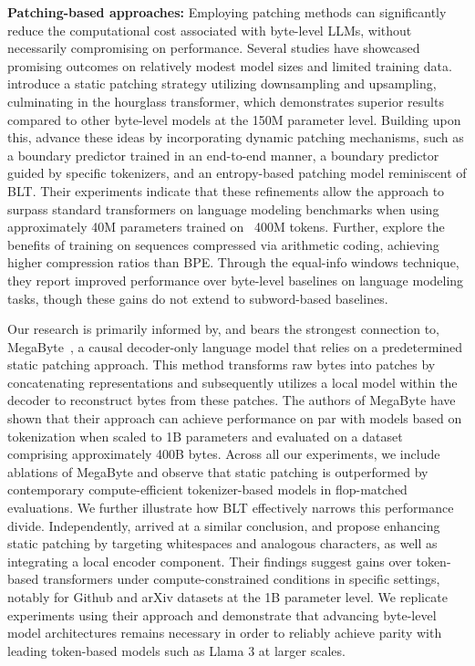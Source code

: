 \textbf{Patching-based approaches:} Employing patching methods can significantly reduce the computational cost associated with byte-level LLMs, without necessarily compromising on performance. Several studies have showcased promising outcomes on relatively modest model sizes and limited training data. \cite{nawrot-etal-2022-hierarchical} introduce a static patching strategy utilizing downsampling and upsampling, culminating in the hourglass transformer, which demonstrates superior results compared to other byte-level models at the 150M parameter level. Building upon this, \cite{nawrot-etal-2023-efficient} advance these ideas by incorporating dynamic patching mechanisms, such as a boundary predictor trained in an end-to-end manner, a boundary predictor guided by specific tokenizers, and an entropy-based patching model reminiscent of {\textsc BLT}. Their experiments indicate that these refinements allow the approach to surpass standard transformers on language modeling benchmarks when using approximately 40M parameters trained on ~400M tokens. Further, \cite{lester2024training} explore the benefits of training on sequences compressed via arithmetic coding, achieving higher compression ratios than BPE. Through the equal-info windows technique, they report improved performance over byte-level baselines on language modeling tasks, though these gains do not extend to subword-based baselines.

Our research is primarily informed by, and bears the strongest connection to, MegaByte~\citep{yu2023megabyte}, a causal decoder-only language model that relies on a predetermined static patching approach. This method transforms raw bytes into patches by concatenating representations and subsequently utilizes a local model within the decoder to reconstruct bytes from these patches. The authors of MegaByte have shown that their approach can achieve performance on par with models based on tokenization when scaled to 1B parameters and evaluated on a dataset comprising approximately 400B bytes. Across all our experiments, we include ablations of MegaByte and observe that static patching is outperformed by contemporary compute-efficient tokenizer-based models in flop-matched evaluations. We further illustrate how {\textsc BLT} effectively narrows this performance divide. Independently, \cite{slagle2024spacebyte} arrived at a similar conclusion, and propose enhancing static patching by targeting whitespaces and analogous characters, as well as integrating a local encoder component. Their findings suggest gains over token-based transformers under compute-constrained conditions in specific settings, notably for Github and arXiv datasets at the 1B parameter level. We replicate experiments using their approach and demonstrate that advancing byte-level model architectures remains necessary in order to reliably achieve parity with leading token-based models such as Llama 3 at larger scales.

